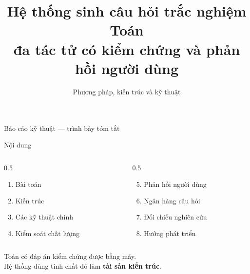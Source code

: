 \documentclass[aspectratio=169,11pt]{beamer}
\title{\bfseries Hệ thống sinh câu hỏi trắc nghiệm Toán\\đa tác tử có kiểm chứng và phản hồi người dùng}
\subtitle{Phương pháp, kiến trúc và kỹ thuật}
\author{}
\date{}
\newcommand{\punch}[1]{\begin{center}\alert{\large #1}\end{center}}
\begin{document}
\begin{frame}[plain]
  \titlepage
  \vspace{-2em}
  \centering
  {\footnotesize\color{cMuted}Báo cáo kỹ thuật --- trình bày tóm tắt}
\end{frame}

\begin{frame}{Nội dung}
  \vfill
  \begin{columns}[T]
    \begin{column}{0.5\textwidth}
      \begin{enumerate}
        \item Bài toán
        \item Kiến trúc
        \item Các kỹ thuật chính
        \item Kiểm soát chất lượng
      \end{enumerate}
    \end{column}
    \begin{column}{0.5\textwidth}
      \begin{enumerate}
        \setcounter{enumi}{4}
        \item Phản hồi người dùng
        \item Ngân hàng câu hỏi
        \item Đối chiếu nghiên cứu
        \item Hướng phát triển
      \end{enumerate}
    \end{column}
  \end{columns}
  \vfill
  \punch{Toán có đáp án kiểm chứng được bằng máy.\\[0.2em] Hệ thống dùng tính chất đó làm \textbf{tài sản kiến trúc}.}
  \vfill
\end{frame}
\end{document}
